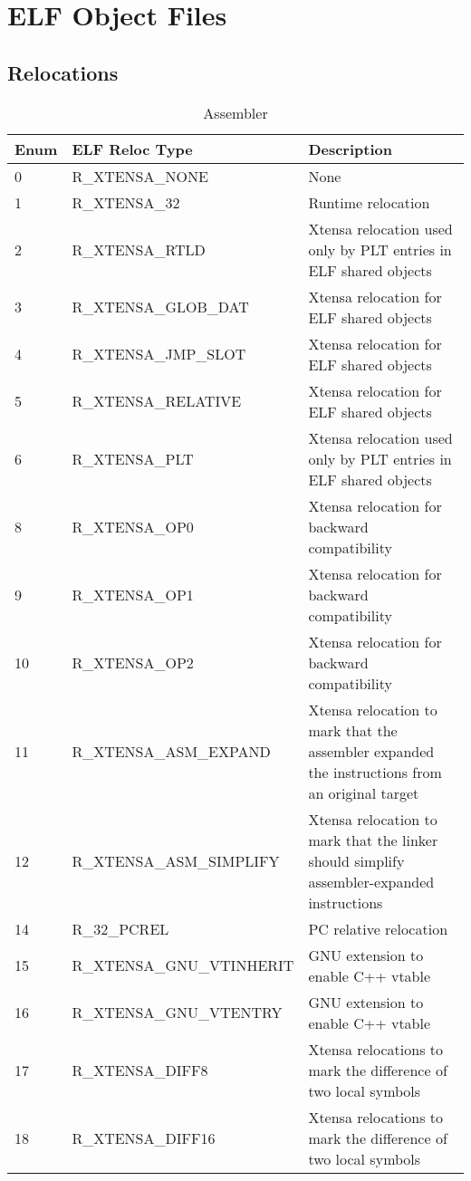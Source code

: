 \chapter{ELF Object Files}
\section{Relocations}
\begin{longtable}{|p{1cm}|p{6cm}|p{10cm}|}
	\caption{Assembler\label{long}}\\
	\hline
	Enum & ELF Reloc Type & Description \\
	\hline
	\endhead
	0 & R\_XTENSA\_NONE & None \\ \hline
	1 & R\_XTENSA\_32 & Runtime relocation \\ \hline
	2 & R\_XTENSA\_RTLD & Xtensa relocation used only by PLT entries in ELF shared objects \\ \hline
	3 & R\_XTENSA\_GLOB\_DAT & Xtensa relocation for ELF shared objects \\ \hline
	4 & R\_XTENSA\_JMP\_SLOT & Xtensa relocation for ELF shared objects \\ \hline
	5 & R\_XTENSA\_RELATIVE & Xtensa relocation for ELF shared objects \\ \hline
	6 & R\_XTENSA\_PLT & Xtensa relocation used only by PLT entries in ELF shared objects \\ \hline
	8 & R\_XTENSA\_OP0 & Xtensa relocation for backward compatibility \\ \hline
	9 & R\_XTENSA\_OP1 & Xtensa relocation for backward compatibility \\ \hline
	10 & R\_XTENSA\_OP2 & Xtensa relocation for backward compatibility \\ \hline
	11 & R\_XTENSA\_ASM\_EXPAND & Xtensa relocation to mark that the assembler expanded the instructions from an original target \\ \hline
	12 & R\_XTENSA\_ASM\_SIMPLIFY & Xtensa relocation to mark that the linker should simplify assembler-expanded instructions \\ \hline
	14 & R\_32\_PCREL & PC relative relocation \\ \hline
	15 & R\_XTENSA\_GNU\_VTINHERIT & GNU extension to enable C++ vtable\\ \hline
	16 & R\_XTENSA\_GNU\_VTENTRY & GNU extension to enable C++ vtable\\ \hline
	17 & R\_XTENSA\_DIFF8 & Xtensa relocations to mark the difference of two local symbols \\ \hline
	18 & R\_XTENSA\_DIFF16 & Xtensa relocations to mark the difference of two local symbols \\ \hline

\end{longtable}
